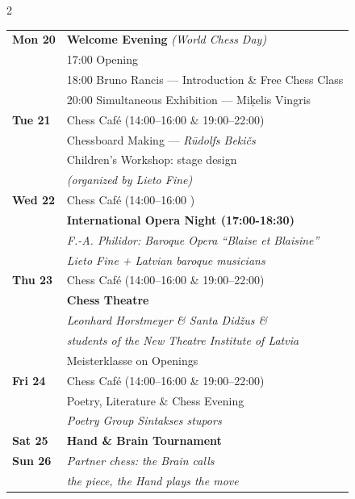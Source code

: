 \documentclass[a4paper,10pt]{article}
\begin{document}
\begin{center}
\begin{minipage}{0.90\paperwidth}
\begin{multicols}{2}
{\footnotesize\setlength{\parskip}{0pt}
\begin{tabular}{@{}p{1.55cm}p{5.5cm}@{}}
\textbf{Mon 20}   & \textbf{Welcome Evening} \textit{(World Chess Day)}\\
                   & 17:00 Opening\\
                   & 18:00 Bruno Rancis — Introduction \& Free Chess Class\\
                   & 20:00 Simultaneous Exhibition — Miķelis Vingris\\[1pt]
\textbf{Tue 21}   & Chess Café (14:00–16:00 \& 19:00–22:00)\\
                   & Chessboard Making — \textit{Rūdolfs Bekičs}\\
                   & Children's Workshop: stage design\\
                   & \hfill\textit{(organized by Lieto Fine)}\\[1pt]
\textbf{Wed 22}   & Chess Café (14:00–16:00 )\\
                   & \textbf{International Opera Night (17:00-18:30)}\\
                   & \textit{F.-A. Philidor: Baroque Opera ``Blaise et Blaisine''}\\
                   & \textit{Lieto Fine + Latvian baroque musicians}\\[1pt]
\textbf{Thu 23}   & Chess Café (14:00–16:00 \& 19:00–22:00)\\
                   & \textbf{Chess Theatre}\\
                   & \textit{Leonhard Horstmeyer \& Santa Did\v{z}us \&}\\
                   & \textit{students of the New Theatre Institute of Latvia}\\
                   & Meisterklasse on Openings\\[1pt]
\textbf{Fri 24}   & Chess Café (14:00–16:00 \& 19:00–22:00)\\
                   & Poetry, Literature \& Chess Evening\\
                   & \textit{Poetry Group Sintakses stupors}\\[1pt]
\textbf{Sat 25}   & \textbf{Hand \& Brain Tournament}\\
\textbf{Sun 26}   & \textit{Partner chess: the Brain calls}\\
                   & \textit{the piece, the Hand plays the move}\\
\end{tabular}
}


\end{multicols}
\end{minipage}
\end{center}
\end{document}
